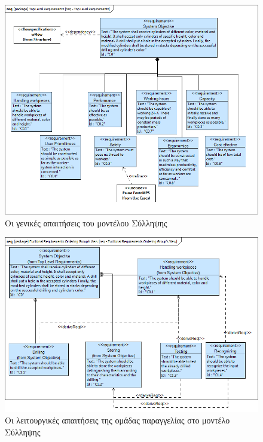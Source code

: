 \documentclass[a4paper,12pt,twoside]{report}
\begin{document}
{\begin{appendices}
				\begin{figure}[hp]
					\centering
					\includegraphics[scale=0.45]{ConceptionalModel_req-TopLevelRequirements.png}
					\caption{Οι γενικές απαιτήσεις του μοντέλου Σύλληψης}
					\label{φωτ:Οι γενικές απαιτήσεις του μοντέλου Σύλληψης}
				\end{figure}
				
				\begin{figure}[hp]
					\centering
					\includegraphics[scale=0.45]{ConceptionalModel_req-FuctionalRequirementsOrderingGroupsView.png}
					\caption{Οι λειτουργικές απαιτήσεις της ομάδας παραγγελίας στο μοντέλο Σύλληψης}
					\label{φωτ:Οι λειτουργικές απαιτήσεις της ομάδας παραγγελίας στο μοντέλο Σύλληψης}
				\end{figure}
				

\end{appendices}}
\end{document}
